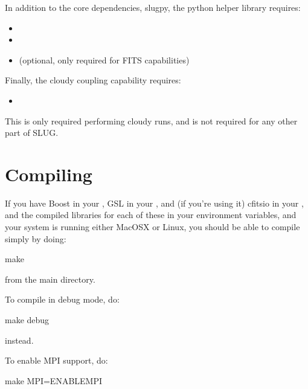 \documentclass[letterpaper,10pt,english]{sphinxmanual}
\begin{document}
In addition to the core dependencies, slugpy, the python helper library requires:
\begin{itemize}
\item {} 

\item {} 

\item {} 
 (optional, only required for FITS capabilities)

\end{itemize}

Finally, the cloudy coupling capability requires:
\begin{itemize}
\item {} 

\end{itemize}

This is only required performing cloudy runs, and is not required for any other part of SLUG.


\section{Compiling}
\label{\detokenize{compiling:ssec-compiling}}\label{\detokenize{compiling:compiling}}
If you have Boost in your , GSL in your , and (if you’re using it) cfitsio in your , and the compiled libraries for each of these in your  environment variables, and your system is running either MacOSX or Linux, you should be able to compile simply by doing:

\begin{sphinxVerbatim}[commandchars=\\\{\}]
make
\end{sphinxVerbatim}

from the main  directory.

To compile in debug mode, do:

\begin{sphinxVerbatim}[commandchars=\\\{\}]
make debug
\end{sphinxVerbatim}

instead.

To enable MPI support, do:

\begin{sphinxVerbatim}[commandchars=\\\{\}]
make MPI=ENABLE\PYGZus{}MPI
\end{sphinxVerbatim}
\end{document}
